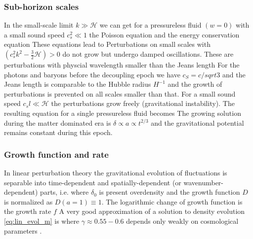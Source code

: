 \subsubsection{Sub-horizon scales}
In the small-scale limit $k\gg\mathcal{H}$ we can get for a pressureless fluid $(w=0)$ with a small sound speed $c_s^2\ll1$ the Poisson equation
and the energy conservation equation
These equations lead to
Perturbations on small scales with $(c_s^2k^2-\frac32\mathcal{H})>0$ do not grow but undergo damped oscillations. These are perturbations with physcial wavelength smaller than the Jeans length
For the photons and baryons before the decoupling epoch we have $c_S=c/sqrt3$ and the Jeans length is comparable to the Hubble radius $H^{-1}$ and the growth of perturbations is prevented on all scales smaller than that. For a small sound speed $c_sl\ll\mathcal{H}$ the perturbations grow freely (gravitational instability). The resulting equation for a single pressureless fluid becomes
The growing solution during the matter dominated era is $\delta\propto a\propto t^{2/3}$ and the gravitational potential remains constant during this epoch.

\subsubsection{Growth function and rate}
In linear perturbation theory the gravitational evolution of fluctuations is separable into time-dependent and spatially-dependent (or wavenumber-dependent) parts, i.e.
where $\delta_0$ is present overdensity and the growth function $D$ is normalized as $D(a=1)\equiv1$. The logarithmic change of growth function is the growth rate $f$
 A very good approximation of a solution to density evolution \eqref{eq:lin_evol_m} is
where $\gamma\approx0.55-0.6$ depends only weakly on cosmological parameters \parencite{1980_Peebles}.

